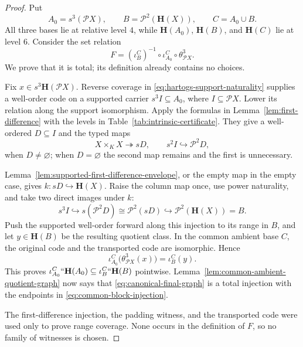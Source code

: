 \documentclass[11pt]{article}
\numberwithin{equation}{section}
\theoremstyle{definition}
\theoremstyle{remark}
\newcommand{\Pow}{\mathcal P}
\newcommand{\inj}{\hookrightarrow}
\newcommand{\surj}{\twoheadrightarrow}
\begin{document}
\begin{proof}
Put
\[
 A_0=s^3(\Pow X),\qquad
 B=\Pow^2(\mathbf H(X)),\qquad C=A_0\cup B.
\]
All three bases lie at relative level $4$, while
$\mathbf H(A_0)$, $\mathbf H(B)$, and $\mathbf H(C)$ lie at level $6$.
Consider the set relation
\begin{equation}
 F=(\iota_B^C)^{-1}\circ\iota_{A_0}^C\circ\theta_{\Pow X}^3.
 \label{eq:canonical-final-graph}
\end{equation}
We prove that it is total; its definition already contains no choices.

Fix $x\in s^3\mathbf H(\Pow X)$.  Reverse coverage in
\eqref{eq:hartogs-support-naturality} supplies a well-order code on a
supported carrier $s^3I\subseteq A_0$, where $I\subseteq\Pow X$.
Lower its relation along the support isomorphism.  Apply the formulas in
Lemma~\ref{lem:first-difference} with the levels in
Table~\ref{tab:intrinsic-certificate}.  They give a well-ordered
$D\subseteq I$ and the typed maps
\begin{equation}
 X\times_KX\surj sD,
 \qquad
 s^2I\inj\Pow^2D,
 \label{eq:typed-first-difference-maps}
\end{equation}
when $D\neq\varnothing$; when $D=\varnothing$ the second map remains and
the first is unnecessary.

Lemma~\ref{lem:supported-first-difference-envelope}, or the empty map in
the empty case, gives $k:sD\inj\mathbf H(X)$.  Raise the column map once,
use power naturality, and take two direct images under $k$:
\begin{equation}
 s^3I
 \inj s(\Pow^2D)
 \cong\Pow^2(sD)
 \inj\Pow^2(\mathbf H(X))=B.
 \label{eq:typed-column-composite}
\end{equation}
Push the supported well-order forward along this injection to its range in
$B$, and let $y\in\mathbf H(B)$ be the resulting quotient class.  In the
common ambient base $C$, the original code and the transported code are
isomorphic.  Hence
\[
 \iota_{A_0}^C\bigl(\theta_{\Pow X}^3(x)\bigr)=\iota_B^C(y).
\]
This proves
\(\iota_{A_0}^C``\mathbf H(A_0)
  \subseteq\iota_B^C``\mathbf H(B)\)
pointwise.  Lemma~\ref{lem:common-ambient-quotient-graph} now says that
\eqref{eq:canonical-final-graph} is a total injection with the endpoints
in \eqref{eq:common-block-injection}.

The first-difference injection, the padding witness, and the transported
code were used only to prove range coverage.  None occurs in the definition
of $F$, so no family of witnesses is chosen.
\end{proof}
\end{document}
